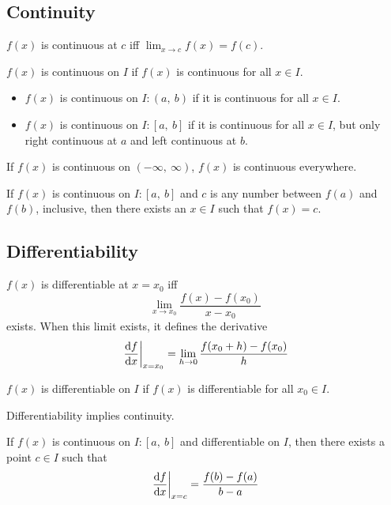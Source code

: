 \documentclass{article}
\begin{document}
\subsection{Continuity}
\begin{theorem}
    $f(x)$ is continuous at $c$ iff $\displaystyle \lim_{x\to c} f(x) = f(c)$.
\end{theorem}
\begin{theorem}
    $f(x)$ is continuous on $I$ if $f(x)$ is continuous for all $x\in I$.
\begin{itemize}
    \item $f(x)$ is continuous on $I:\left( a,\:b \right)$ if it is continuous
        for all $x\in I$.
    \item $f(x)$ is continuous on $I:\left[ a,\:b \right]$ if it is continuous
        for all $x\in I$, but only right continuous at $a$ and left continuous at $b$.
\end{itemize}
    If $f(x)$  is continuous on $\left(-\infty,\:\infty\right)$, $f(x)$ is
    continuous everywhere.
\end{theorem}
\begin{theorem}
    If $f(x)$ is continuous on $I:\left[ a, \: b \right]$ and $c$ is any number
    between $f(a)$ and $f(b)$, inclusive, then there exists an $x\in I$ such
    that $f(x)=c$.
\end{theorem}
\subsection{Differentiability}
\begin{theorem}[Differentiability]
    $f(x)$ is differentiable at $x=x_0$ iff
    \begin{equation*}
        \lim_{x\to x_0} \frac{f(x)-f(x_0)}{x-x_0}
    \end{equation*}
    exists. When this limit exists, it defines the derivative
    \begin{equation*}
        \left.\dv{f}{x}\right|_{x=x_0} = \lim_{h\to 0} \frac{f(x_0+h)-f(x_0)}{h}
    \end{equation*}
\end{theorem}
\begin{theorem}
    $f(x)$ is differentiable on $I$ if $f(x)$ is differentiable for all
    $x_0\in I$.
\end{theorem}
\begin{theorem}
    Differentiability implies continuity.
\end{theorem}
\begin{theorem}
    If $f(x)$ is continuous on $I:\left[ a,\:b \right]$ and differentiable on
    $I$, then there exists a point $c\in I$ such that
    \begin{equation*}
        \left.\dv{f}{x}\right|_{x=c}=\frac{f(b)-f(a)}{b-a}
    \end{equation*}
\end{theorem}
\newpage
\end{document}
